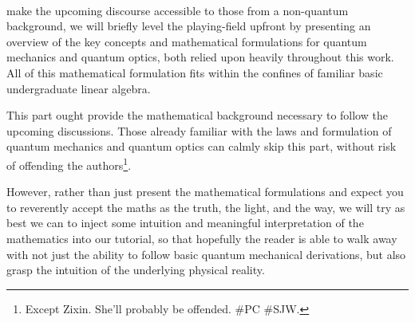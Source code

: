\\

 make the upcoming discourse accessible to those from a non-quantum background, we will briefly level the playing-field upfront by presenting an overview of the key concepts and mathematical formulations for quantum mechanics and quantum optics, both relied upon heavily throughout this work. All of this mathematical formulation fits within the confines of familiar basic undergraduate linear algebra.

This part ought provide the mathematical background necessary to follow the upcoming discussions. Those already familiar with the laws and formulation of quantum mechanics and quantum optics can calmly skip this part, without risk of offending the authors\footnote{Except Zixin. She'll probably be offended. \#PC \#SJW.}.

However, rather than just present the mathematical formulations and expect you to reverently accept the maths as the truth, the light, and the way, we will try as best we can to inject some intuition and meaningful interpretation of the mathematics into our tutorial, so that hopefully the reader is able to walk away with not just the ability to follow basic quantum mechanical derivations, but also grasp the intuition of the underlying physical reality.